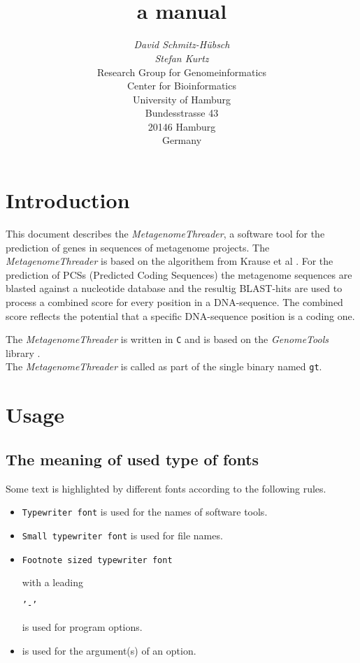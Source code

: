 \documentclass[12pt,titlepage]{article}
\title{\MetagenomeThreader\\
a manual}
\author{\begin{tabular}{c}
         \textit{David Schmitz-H\"{u}bsch}\\
         \textit{Stefan Kurtz}\\[1cm]
         Research Group for Genomeinformatics\\
         Center for Bioinformatics\\
         University of Hamburg\\
         Bundesstrasse 43\\
         20146 Hamburg\\
         Germany\\[1cm]
        \end{tabular}}
\newcommand{\MetagenomeThreader}{\textit{MetagenomeThreader}\xspace}
\newcommand{\GenomeTools}{\textit{GenomeTools}\xspace}
\newcommand{\Gt}{\texttt{gt}\xspace}
\begin{document}
\maketitle



\section{Introduction} \label{Introduction}

This document describes the \MetagenomeThreader, a software tool
for the prediction of genes in sequences of metagenome projects.
The \MetagenomeThreader is based on the algorithem from Krause et al \cite{krause}.
For the prediction of PCSs (Predicted Coding Sequences) the metagenome sequences are
blasted against a nucleotide database and the resultig BLAST-hits are used to
process a combined score for every position in a DNA-sequence. The combined score
reflects the potential that a specific DNA-sequence position is a coding one.

The \MetagenomeThreader is written in \texttt{C} and is based 
on the \GenomeTools library \cite{genometools}.
\\
The \MetagenomeThreader is called as part of the single binary named \Gt. 

\section{Usage} \label{Usage}

\subsection{The meaning of used type of fonts} \label{Fonts}
Some text is highlighted by different fonts according to the following rules.

\begin{itemize}
\item \texttt{Typewriter font} is used for the names of software tools.
\item \texttt{\small{Small typewriter font}} is used for file names.
\item \begin{footnotesize}\texttt{Footnote sized typewriter font}
      \end{footnotesize} with a leading 
      \begin{footnotesize}\texttt{'-'}\end{footnotesize} 
      is used for program options.
\item {} is used for the argument(s) of an
      option.
\end{itemize}
\end{document}
